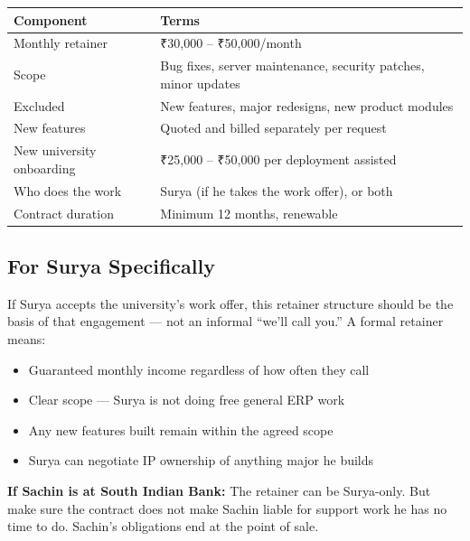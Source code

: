 \documentclass[12pt,a4paper]{article}
\begin{document}
    \begin{tabularx}{\textwidth}{L{5cm} X}
    \toprule
    \textbf{Component} & \textbf{Terms} \\
    \midrule
    Monthly retainer & ₹30,000 – ₹50,000/month \\
    Scope & Bug fixes, server maintenance, security patches, minor updates \\
    Excluded & New features, major redesigns, new product modules \\
    New features & Quoted and billed separately per request \\
    New university onboarding & ₹25,000 – ₹50,000 per deployment assisted \\
    Who does the work & Surya (if he takes the work offer), or both \\
    Contract duration & Minimum 12 months, renewable \\
    \bottomrule
    \end{tabularx}

    \vspace{0.4cm}

    \subsection*{For Surya Specifically}

    If Surya accepts the university's work offer, this retainer structure should be the basis of that engagement — not an informal ``we'll call you.'' A formal retainer means:

    \begin{itemize}[leftmargin=*, noitemsep]
        \item Guaranteed monthly income regardless of how often they call
        \item Clear scope — Surya is not doing free general ERP work
        \item Any new features built remain within the agreed scope
        \item Surya can negotiate IP ownership of anything major he builds
    \end{itemize}

    \begin{warnbox}
    \textbf{If Sachin is at South Indian Bank:} The retainer can be Surya-only. But make sure the contract does not make Sachin liable for support work he has no time to do. Sachin's obligations end at the point of sale.
    \end{warnbox}
\end{document}
